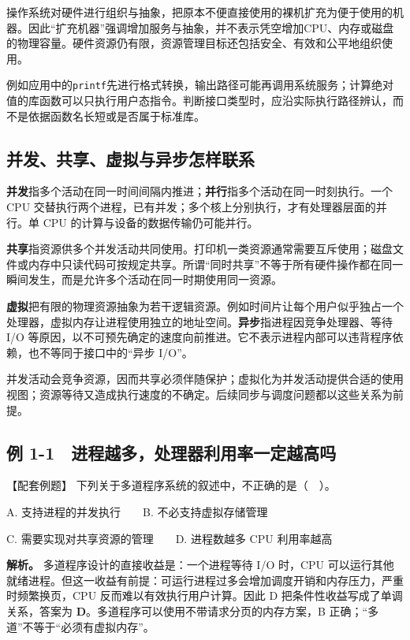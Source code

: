 操作系统对硬件进行组织与抽象，把原本不便直接使用的裸机扩充为便于使用的机器。因此``扩充机器''强调增加服务与抽象，并不表示凭空增加CPU、内存或磁盘的物理容量。硬件资源仍有限，资源管理目标还包括安全、有效和公平地组织使用。

例如应用中的\texttt{printf}先进行格式转换，输出路径可能再调用系统服务；计算绝对值的库函数可以只执行用户态指令。判断接口类型时，应沿实际执行路径辨认，而不是依据函数名长短或是否属于标准库。

\subsection{并发、共享、虚拟与异步怎样联系}\label{OS01-auto-1}

\textbf{并发}指多个活动在同一时间间隔内推进；\textbf{并行}指多个活动在同一时刻执行。一个 CPU 交替执行两个进程，已有并发；多个核上分别执行，才有处理器层面的并行。单 CPU 的计算与设备的数据传输仍可能并行。

\textbf{共享}指资源供多个并发活动共同使用。打印机一类资源通常需要互斥使用；磁盘文件或内存中只读代码可按规定共享。所谓``同时共享''不等于所有硬件操作都在同一瞬间发生，而是允许多个活动在同一时期使用同一资源。

\textbf{虚拟}把有限的物理资源抽象为若干逻辑资源。例如时间片让每个用户似乎独占一个处理器，虚拟内存让进程使用独立的地址空间。\textbf{异步}指进程因竞争处理器、等待 I/O 等原因，以不可预先确定的速度向前推进。它不表示进程内部可以违背程序依赖，也不等同于接口中的``异步 I/O''。

并发活动会竞争资源，因而共享必须伴随保护；虚拟化为并发活动提供合适的使用视图；资源等待又造成执行速度的不确定。后续同步与调度问题都以这些关系为前提。

\subsection{例 1-1　进程越多，处理器利用率一定越高吗}\label{OS01-ex1-1}

{\begin{example}[配套例题]

【配套例题】 下列关于多道程序系统的叙述中，不正确的是（　）。

A. 支持进程的并发执行　　B. 不必支持虚拟存储管理

C. 需要实现对共享资源的管理　　D. 进程数越多 CPU 利用率越高

\end{example}}

\textbf{解析。} 多道程序设计的直接收益是：一个进程等待 I/O 时，CPU 可以运行其他就绪进程。但这一收益有前提：可运行进程过多会增加调度开销和内存压力，严重时频繁换页，CPU 反而难以有效执行用户计算。因此 D 把条件性收益写成了单调关系，答案为 \textbf{D}。多道程序可以使用不带请求分页的内存方案，B 正确；``多道''不等于``必须有虚拟内存''。

